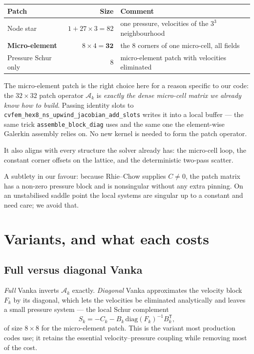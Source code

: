 \documentclass[11pt,a4paper]{article}
\newcommand{\code}[1]{\texttt{\small #1}}
\begin{document}
\begin{center}
\begin{tabular}{@{}lrl@{}}
\toprule
Patch & Size & Comment \\
\midrule
Node star & $1 + 27\times3 = 82$ & one pressure, velocities of the $3^3$ neighbourhood \\
\textbf{Micro-element} & $8\times4 = \mathbf{32}$ & the 8 corners of one micro-cell, all fields \\
Pressure Schur only & 8 & micro-element patch with velocities eliminated \\
\bottomrule
\end{tabular}
\end{center}

\begin{tcolorbox}[colback=green!4,colframe=green!45!black,title=\bfseries Recommendation: the micro-element patch]
The micro-element patch is the right choice here for a reason specific to our code: the
$32\times32$ patch operator $\mathcal{A}_k$ is \emph{exactly the dense micro-cell matrix we
already know how to build}. Passing identity slots to
\code{cvfem\_hex8\_ns\_upwind\_jacobian\_add\_slots} writes it into a local buffer --- the same
trick \code{assemble\_block\_diag} uses and the same one the element-wise Galerkin assembly
relies on. No new kernel is needed to form the patch operator.

It also aligns with every structure the solver already has: the micro-cell loop, the constant
corner offsets on the lattice, and the deterministic two-pass scatter.
\end{tcolorbox}

A subtlety in our favour: because Rhie--Chow supplies $C \neq 0$, the patch matrix has a
non-zero pressure block and is nonsingular without any extra pinning. On an unstabilised
saddle point the local systems are singular up to a constant and need care; we avoid that.

\section{Variants, and what each costs}

\subsection{Full versus diagonal Vanka}
\emph{Full} Vanka inverts $\mathcal{A}_k$ exactly. \emph{Diagonal} Vanka approximates the
velocity block $F_k$ by its diagonal, which lets the velocities be eliminated analytically and
leaves a small pressure system --- the local Schur complement
\begin{equation}
S_k = -C_k - B_k\,\mathrm{diag}(F_k)^{-1} B_k^{\mathsf T},
\end{equation}
of size $8\times8$ for the micro-element patch. This is the variant most production codes use;
it retains the essential velocity--pressure coupling while removing most of the cost.
\end{document}

